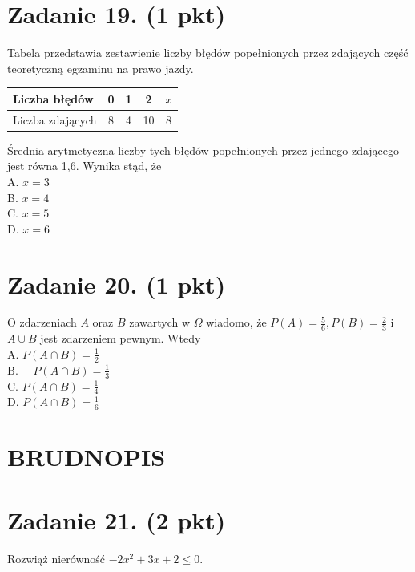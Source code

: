 \documentclass[10pt]{article}
\begin{document}
\section*{Zadanie 19. (1 pkt)}
Tabela przedstawia zestawienie liczby błędów popełnionych przez zdających część teoretyczną egzaminu na prawo jazdy.

\begin{center}
\begin{tabular}{|l|c|c|c|c|}
\hline
Liczba błędów & 0 & 1 & 2 & \(x\) \\
\hline
Liczba zdających & 8 & 4 & 10 & 8 \\
\hline
\end{tabular}
\end{center}

Średnia arytmetyczna liczby tych błędów popełnionych przez jednego zdającego jest równa 1,6. Wynika stąd, że\\
A. \(x=3\)\\
B. \(x=4\)\\
C. \(x=5\)\\
D. \(x=6\)

\section*{Zadanie 20. (1 pkt)}
O zdarzeniach \(A\) oraz \(B\) zawartych w \(\Omega\) wiadomo, że \(P(A)=\frac{5}{6}, P(B)=\frac{2}{3}\) i \(A \cup B\) jest zdarzeniem pewnym. Wtedy\\
A. \(P(A \cap B)=\frac{1}{2}\)\\
B. \(\quad P(A \cap B)=\frac{1}{3}\)\\
C. \(P(A \cap B)=\frac{1}{4}\)\\
D. \(P(A \cap B)=\frac{1}{6}\)

\section*{BRUDNOPIS}
\section*{Zadanie 21. (2 pkt)}
Rozwiąż nierówność \(-2 x^{2}+3 x+2 \leq 0\).
\end{document}
